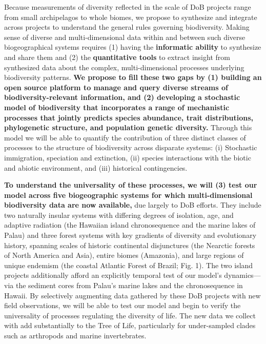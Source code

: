 \documentclass[11pt]{article}
\begin{document}
Because measurements of diversity reflected in the scale of DoB
projects range from small archipelagos to whole biomes, we propose to
synthesize and integrate across projects to understand the general
rules governing biodiversity. Making sense of diverse and
multi-dimensional data within and between such diverse biogeographical
systems requires (1) having the \textbf{informatic ability} to
synthesize and share them and (2) the \textbf{quantitative tools} to
extract insight from synthesized data about the complex,
multi-dimensional processes underlying biodiversity
patterns. \textbf{We propose to fill these two gaps by (1) building an
  open source platform to manage and query diverse streams of
  biodiversity-relevant information, and (2) developing a stochastic
  model of biodiversity that incorporates a range of mechanistic
  processes that jointly predicts species abundance, trait
  distributions, phylogenetic structure, and population genetic
  diversity.}  Through this model we will be able to quantify the
contribution of three distinct classes of processes to the structure
of biodiversity across disparate systems: (i) Stochastic immigration,
speciation and extinction, (ii) species interactions with the biotic
and abiotic environment, and (iii) historical contingencies.

\textbf{To understand the universality of these processes, we will (3)
test our model across five biogeographic systems for which
multi-dimensional biodiversity data are now available,} due largely to
DoB efforts. They include two naturally insular systems with differing
degrees of isolation, age, and adaptive radiation (the Hawaiian island
chronosequence and the marine lakes of Palau) and three forest systems
with key gradients of diversity and evolutionary history, spanning
scales of historic continental disjunctures (the Nearctic forests of
North America and Asia), entire biomes (Amazonia), and large regions of
unique endemism (the coastal Atlantic Forest of Brazil; Fig. 1). The two
island projects additionally afford an explicitly temporal test of our
model's dynamics---via the sediment cores from Palau's marine lakes and
the chronosequence in Hawaii. By selectively augmenting data gathered by
these DoB projects with new field observations, we will be able to test
our model and begin to verify the universality of processes regulating
the diversity of life. The new data we collect with add substantially
to the Tree of Life, particularly for under-sampled clades such as
arthropods and marine invertebrates.
\end{document}
